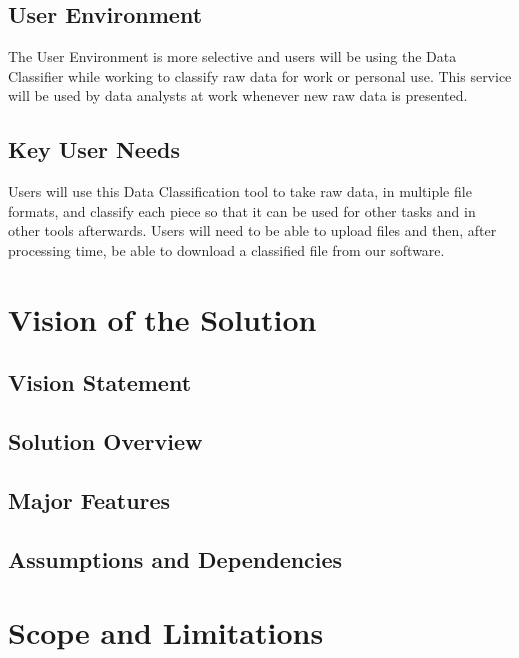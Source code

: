 \documentclass[12pt,oneside,letterpaper]{article}
\begin{document}
\subsection{User Environment}
The User Environment is more selective and users will be using the Data Classifier while working to classify raw data for work or personal use. This service will be used by data analysts at work whenever new raw data is presented.

\subsection{Key User Needs}
Users will use this Data Classification tool to take raw data, in multiple file formats, and classify each piece so that it can be used for other tasks and in other tools afterwards. Users will need to be able to upload files and then, after processing time, be able to download a classified file from our software.


\section{Vision of the Solution}
\subsection{Vision Statement}
\subsection{Solution Overview}
\subsection{Major Features}
\subsection{Assumptions and Dependencies}



\newpage
\section{Scope and Limitations}
\end{document}
